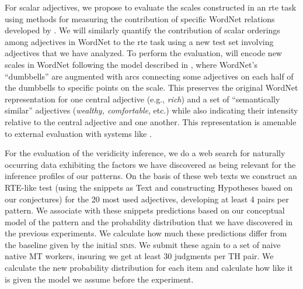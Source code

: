\documentclass[10pt]{article}
\begin{document}
For scalar adjectives, we propose to evaluate the scales constructed in an {\sc rte} task using methods for measuring the contribution of specific WordNet relations developed by \cite{clark2008using,clark2008augmenting,clark2007role}. 
We will similarly quantify the contribution of scalar orderings among adjectives in WordNet to the {\sc rte} task using a new test set involving adjectives that we have analyzed. 
To perform the evaluation, will encode new scales in WordNet following the model described in 
\cite{sheinmanetal2013}, where WordNet's ``dumbbells'' are augmented with arcs connecting some  adjectives on each half of the dumbbells to specific 
points on the scale. This preserves the original WordNet representation for one central 
adjective (e.g., \emph{rich}) and a set of ``semantically similar'' adjectives (\emph{wealthy, comfortable}, etc.) while also indicating their intensity relative to the central adjective and one another.
This representation is amenable to external evaluation with systems like \cite{clark2007role}.



For the evaluation of the veridicity inference, we do a web search for naturally occurring data exhibiting the factors we have discovered  as being relevant for the inference profiles of our patterns. On the basis of these web texts we construct an RTE-like test (using the snippets as Text and constructing Hypotheses based on our conjectures) for the 20 most used adjectives, developing at least 4 pairs per pattern. We associate with these snippets predictions based on our conceptual model of the pattern and the probability distribution that we have discovered in the previous experiments. We calculate how much these predictions differ from the baseline given by the initial \textsc{sims}. We submit these again to a set of naive native MT workers, insuring we get at least 30 judgments per TH pair. We calculate the new probability distribution for each item and calculate how like it is given the model we assume before the experiment. 
\end{document}
